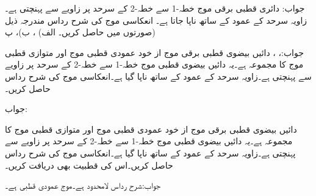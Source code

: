 جواب:
دائری قطبی برقی موج خطہ-1  سے خطہ-2   کے سرحد پر  زاویے سے  پہنچتی ہے۔زاویہ سرحد کے عمود کے ساتھ ناپا جاتا ہے۔ انعکاسی موج کی شرح رداس مندرجہ ذیل صورتوں میں حاصل کریں۔ الف) ،
 ب)، پ) 

جواب:، ، 
دائیں بیضوی قطبی برقی موج از خود عمودی قطبی موج   اور متوازی قطبی موج   کا مجموعہ ہے۔یہ دائیں بیضوی قطبی موج خطہ-1  سے خطہ-2   کے سرحد  پر  زاویے سے  پہنچتی ہے۔زاویہ سرحد کے عمود کے ساتھ ناپا گیا ہے۔انعکاسی موج کی شرح رداس حاصل کریں۔

جواب:

دائیں بیضوی قطبی برقی موج از خود عمودی قطبی موج   اور متوازی قطبی موج   کا مجموعہ ہے۔یہ دائیں بیضوی قطبی موج خطہ-1  سے خطہ-2   کے سرحد  پر  زاویے سے  پہنچتی ہے۔زاویہ سرحد کے عمود کے ساتھ ناپا گیا ہے۔انعکاسی موج کی شرح رداس حاصل کریں۔اس کی قطبیت بھی دریافت کریں۔

جواب:شرح رداس لامحدود ہے۔موج عمودی قطبی ہے۔
